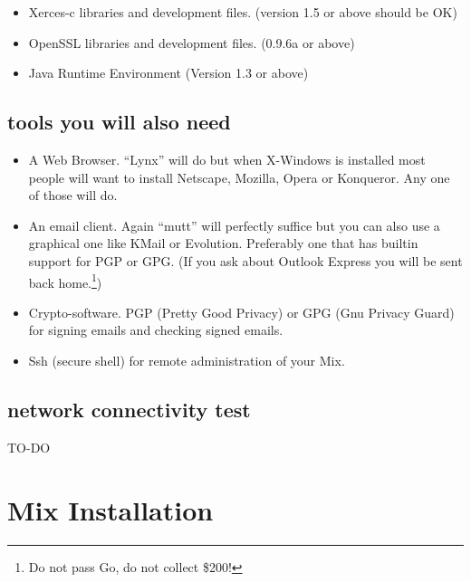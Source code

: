 \documentclass{article}
\begin{document}
\begin{itemize}
\item Xerces-c libraries and development files. (version 1.5 or above should be OK)

\item OpenSSL libraries and development files. (0.9.6a or above)

\item Java Runtime Environment (Version 1.3 or above)
\end{itemize}


\subsection{tools you will also need}

\begin{itemize}
\item{A Web Browser}. ``Lynx'' will do but when X-Windows is installed most
people will want to install Netscape, Mozilla, Opera or Konqueror. Any
one of those will do.

\item{An email client}. Again ``mutt'' will perfectly suffice but you can
also use a graphical one like KMail or Evolution. Preferably one that
has builtin support for PGP or GPG. (If you ask about Outlook Express
you will be sent back home.\footnote{Do not pass Go, do not collect
  \$200!})

\item{Crypto-software}. PGP (Pretty Good Privacy) or GPG (Gnu Privacy
  Guard) for signing emails and checking signed emails.

\item{Ssh} (secure shell) for remote administration of your Mix.
\end{itemize}

\subsection{network connectivity test}

TO-DO



\section{Mix Installation}
\end{document}
